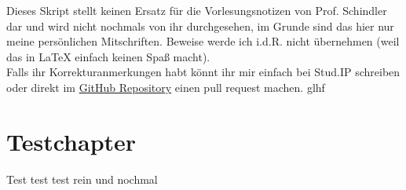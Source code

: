\documentclass{jvfscript-de}
\begin{document}
	\frontmatter
	\maketitle
	
	\tableofcontents
	\newpage
	\thispagestyle{plain}
	Dieses Skript stellt keinen Ersatz für die Vorlesungsnotizen von Prof. Schindler dar und wird nicht nochmals von ihr durchgesehen, im Grunde sind das hier nur meine persönlichen Mitschriften. Beweise werde ich i.d.R. nicht übernehmen (weil das in \LaTeX{} einfach keinen Spaß macht).\\
	Falls ihr Korrekturanmerkungen habt könnt ihr mir einfach bei Stud.IP schreiben oder direkt im \href{https://github.com/vonfalkenstein/Vorlesungsmitschrift-Zahlentheorie}{GitHub Repository} einen pull request machen. \hspace{\fill} glhf
	\newpage
	\mainmatter
	
	
	
	
	
%	
\chapter{Testchapter}Test test test \newpage rein \newpage und nochmal
	
	
	
	
	
	
	\appendix
	\renewcommand{\appendixtocname}{Anhang}
	\addappheadtotoc
	\printindex
	\printindex[lecture]
\end{document}
